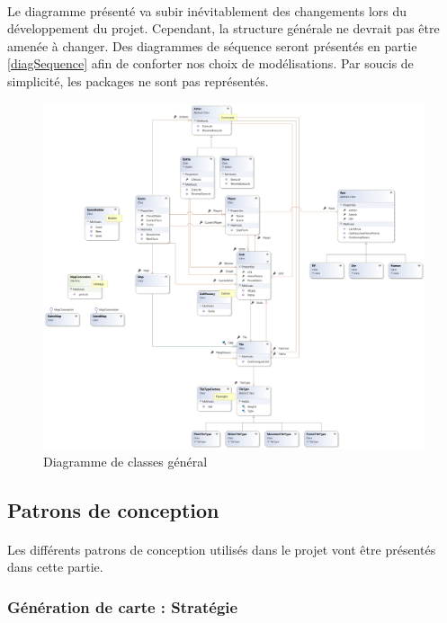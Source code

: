\paragraph{}
Le diagramme présenté va subir inévitablement des changements lors du développement du projet. Cependant, la structure générale ne devrait pas être amenée à changer. Des diagrammes de séquence seront présentés en partie \ref{diagSequence} afin de conforter nos choix de modélisations. Par soucis de simplicité, les packages ne sont pas représentés.

\begin{figure}[h]
  \centering
  \includegraphics[width=13cm]{schemas/ClassDiagram.png}
  \caption{Diagramme de classes général}
  \label{fig:class}
\end{figure}

\subsection{Patrons de conception}

\paragraph{}
Les différents patrons de conception utilisés dans le projet vont être présentés dans cette partie.

\subsubsection{Génération de carte : Stratégie}

